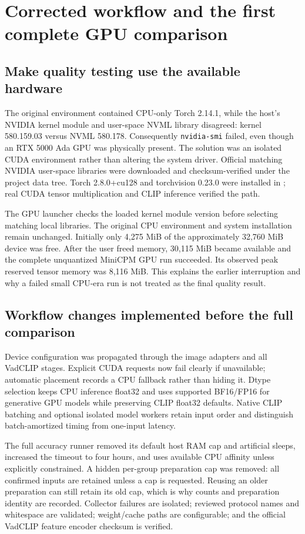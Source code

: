 \chapter{Corrected workflow and the first complete GPU comparison}
\label{ch:baseline}
\section{Make quality testing use the available hardware}
The original environment contained CPU-only Torch 2.14.1, while the host's NVIDIA kernel module and user-space NVML library disagreed: kernel 580.159.03 versus NVML 580.178. Consequently \texttt{nvidia-smi} failed, even though an RTX 5000 Ada GPU was physically present. The solution was an isolated CUDA environment rather than altering the system driver. Official matching NVIDIA user-space libraries were downloaded and checksum-verified under the project data tree. Torch 2.8.0+cu128 and torchvision 0.23.0 were installed in ; real CUDA tensor multiplication and CLIP inference verified the path.

The GPU launcher checks the loaded kernel module version before selecting matching local libraries. The original CPU environment and system installation remain unchanged. Initially only 4,275 MiB of the approximately 32,760 MiB device was free. After the user freed memory, 30,115 MiB became available and the complete unquantized MiniCPM GPU run succeeded. Its observed peak reserved tensor memory was 8,116 MiB. This explains the earlier interruption and why a failed small CPU-era run is not treated as the final quality result.

\section{Workflow changes implemented before the full comparison}
Device configuration was propagated through the image adapters and all VadCLIP stages. Explicit CUDA requests now fail clearly if unavailable; automatic placement records a CPU fallback rather than hiding it. Dtype selection keeps CPU inference float32 and uses supported BF16/FP16 for generative GPU models while preserving CLIP float32 defaults. Native CLIP batching and optional isolated model workers retain input order and distinguish batch-amortized timing from one-input latency.

The full accuracy runner removed its default host RAM cap and artificial sleeps, increased the timeout to four hours, and uses available CPU affinity unless explicitly constrained. A hidden per-group preparation cap was removed: all confirmed inputs are retained unless a cap is requested. Reusing an older preparation can still retain its old cap, which is why counts and preparation identity are recorded. Collector failures are isolated; reviewed protocol names and whitespace are validated; weight/cache paths are configurable; and the official VadCLIP feature encoder checksum is verified.

